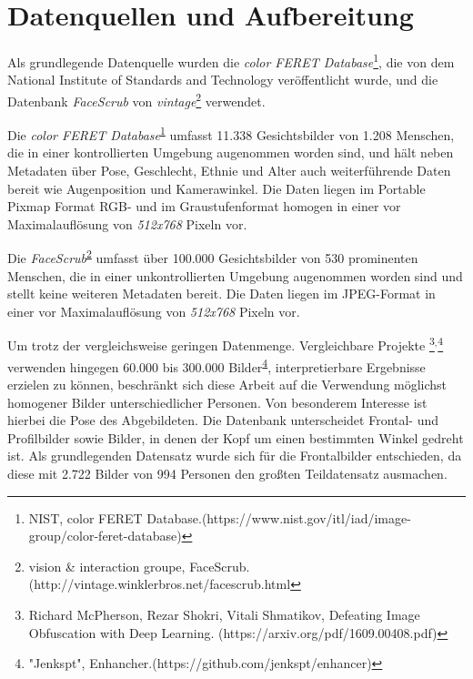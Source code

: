 \section{Datenquellen und Aufbereitung}

Als grundlegende Datenquelle wurden die
\textit{color FERET Database}\footnote{NIST, color FERET Database.\newline(https://www.nist.gov/itl/iad/image-group/color-feret-database)\label{footnote:color-feret}},
die von dem National Institute of Standards and Technology veröffentlicht wurde, und die
Datenbank \textit{FaceScrub} von \textit{vintage}\footnote{vision \& interaction groupe, FaceScrub.\newline(http://vintage.winklerbros.net/facescrub.html\label{footnote:face-scrub}} verwendet.

Die \textit{color FERET Database}\textsuperscript{\ref{footnote:color-feret}} umfasst 11.338 Gesichtsbilder von 1.208 Menschen, die in einer kontrollierten Umgebung augenommen worden sind, und
hält neben Metadaten über Pose, Geschlecht, Ethnie und Alter auch weiterführende Daten bereit wie Augenposition und
Kamerawinkel. Die Daten liegen im Portable Pixmap Format RGB- und im Graustufenformat homogen in einer vor Maximalauflösung von \textit{512x768} Pixeln vor.

Die \textit{FaceScrub}\textsuperscript{\ref{footnote:face-scrub}} umfasst über 100.000 Gesichtsbilder von 530 prominenten Menschen, die in einer unkontrollierten Umgebung augenommen worden sind und stellt keine
weiteren Metadaten bereit. Die Daten liegen im JPEG-Format in einer vor Maximalauflösung von \textit{512x768} Pixeln vor.


Um trotz der vergleichsweise geringen Datenmenge. Vergleichbare Projekte
\footnote{Richard McPherson, Rezar Shokri, Vitali Shmatikov, Defeating Image Obfuscation with Deep Learning. (https://arxiv.org/pdf/1609.00408.pdf)}$^{,}$\footnote{"Jenkspt", Enhancher.\newline(https://github.com/jenkspt/enhancer)\label{enhancer}}
verwenden hingegen 60.000 bis 300.000 Bilder\textsuperscript{\ref{enhancer}}, interpretierbare Ergebnisse erzielen zu können, beschränkt sich diese Arbeit auf
die Verwendung möglichst homogener Bilder unterschiedlicher Personen. Von besonderem Interesse ist hierbei die Pose des
Abgebildeten. Die Datenbank unterscheidet Frontal- und Profilbilder sowie Bilder, in denen der Kopf um einen bestimmten
Winkel gedreht ist. Als grundlegenden Datensatz wurde sich für die Frontalbilder entschieden, da diese mit 2.722 Bilder
von 994 Personen den großten Teildatensatz ausmachen.

